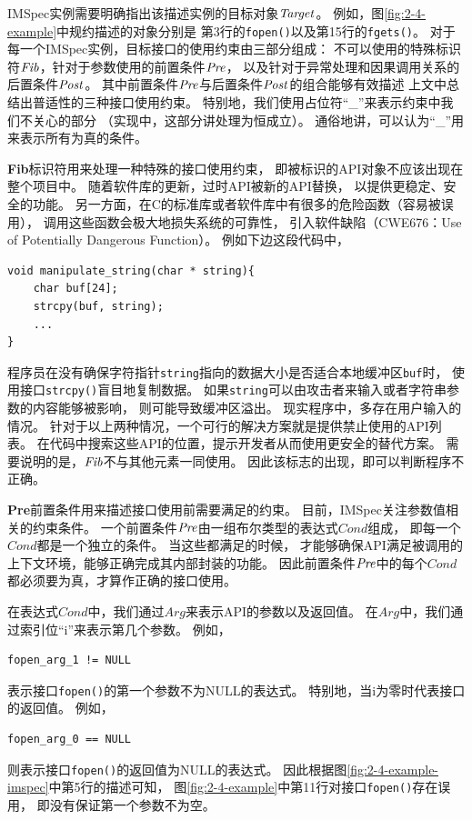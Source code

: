 
IMSpec实例需要明确指出该描述实例的目标对象$\mathit{Target}$。
例如，图\ref{fig:2-4-example}中规约描述的对象分别是
第3行的\texttt{fopen()}以及第15行的\texttt{fgets()}。
对于每一个IMSpec实例，目标接口的使用约束由三部分组成：
不可以使用的特殊标识符$\mathit{Fib}$，针对于参数使用的前置条件$\mathit{Pre}$，
以及针对于异常处理和因果调用关系的后置条件$\mathit{Post}$。
其中前置条件$\mathit{Pre}$与后置条件$\mathit{Post}$的组合能够有效描述
上文中总结出普适性的三种接口使用约束。
特别地，我们使用占位符“\_”来表示约束中我们不关心的部分
（实现中，这部分讲处理为恒成立）。
通俗地讲，可以认为“\_”用来表示所有为真的条件。

\textbf{Fib}标识符用来处理一种特殊的接口使用约束，
即被标识的API对象不应该出现在整个项目中。
随着软件库的更新，过时API被新的API替换，
以提供更稳定、安全的功能。
另一方面，在C的标准库或者软件库中有很多的危险函数（容易被误用），
调用这些函数会极大地损失系统的可靠性，
引入软件缺陷（CWE676：Use of Potentially Dangerous Function）。
例如下边这段代码中，
\begin{lstlisting}[language={[ANSI]C},
basicstyle=\linespread{0.8}\listingsfont,
numbers=none,
xleftmargin=.3\textwidth]
void manipulate_string(char * string){
	char buf[24];
	strcpy(buf, string);
	...
}
\end{lstlisting}
程序员在没有确保字符指针\texttt{string}指向的数据大小是否适合本地缓冲区\texttt{buf}时，
使用接口\texttt{strcpy()}盲目地复制数据。
如果\texttt{string}可以由攻击者来输入或者字符串参数的内容能够被影响，
则可能导致缓冲区溢出。
现实程序中，多存在用户输入的情况。
针对于以上两种情况，一个可行的解决方案就是提供禁止使用的API列表。
在代码中搜索这些API的位置，提示开发者从而使用更安全的替代方案。
需要说明的是，$\mathit{Fib}$不与其他元素一同使用。
因此该标志的出现，即可以判断程序不正确。


\textbf{Pre}前置条件用来描述接口使用前需要满足的约束。
目前，IMSpec关注参数值相关的约束条件。
一个前置条件$\mathit{Pre}$由一组布尔类型的表达式$\mathit{Cond}$组成，
即每一个$\mathit{Cond}$都是一个独立的条件。
当这些都满足的时候，
才能够确保API满足被调用的上下文环境，能够正确完成其内部封装的功能。
因此前置条件$\mathit{Pre}$中的每个$\mathit{Cond}$都必须要为真，才算作正确的接口使用。

在表达式$\mathit{Cond}$中，我们通过$\mathit{Arg}$来表示API的参数以及返回值。
在$\mathit{Arg}$中，我们通过索引位“i”来表示第几个参数。
例如，
\begin{lstlisting}[language={[ANSI]C},
basicstyle=\linespread{0.8}\listingsfont,
numbers=none,
xleftmargin=.3\textwidth]
fopen_arg_1 != NULL
\end{lstlisting}
表示接口\texttt{fopen()}的第一个参数不为NULL的表达式。
特别地，当i为零时代表接口的返回值。
例如，
\begin{lstlisting}[language={[ANSI]C},
basicstyle=\linespread{0.8}\listingsfont,
numbers=none,
xleftmargin=.3\textwidth,]
fopen_arg_0 == NULL
\end{lstlisting}
则表示接口\texttt{fopen()}的返回值为NULL的表达式。
因此根据图\ref{fig:2-4-example-imspec}中第5行的描述可知，
图\ref{fig:2-4-example}中第11行对接口\texttt{fopen()}存在误用，
即没有保证第一个参数不为空。


